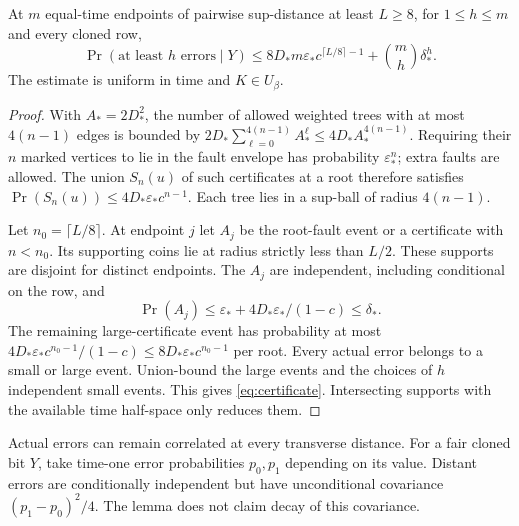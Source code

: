 \begin{lemma}\label{lem:certificates}
At $m$ equal-time endpoints of pairwise sup-distance at least
$L\geq8$, for $1\leq h\leq m$ and every cloned row,
\begin{equation}\label{eq:certificate}
 \Pr(\text{at least }h\text{ errors}\mid Y)
 \leq8D_*m\varepsilon_*c^{\lceil L/8\rceil-1}
                                  +\binom mh\delta_*^h.
\end{equation}
The estimate is uniform in time and $K\in U_\beta$.
\end{lemma}
\begin{proof}
With $A_*=2D_*^2$, the number of allowed weighted trees with at
most $4(n-1)$ edges is bounded by
$2D_*\sum_{\ell=0}^{4(n-1)}A_*^\ell
\leq4D_*A_*^{4(n-1)}$. Requiring their $n$ marked vertices
to lie in the fault envelope has probability $\varepsilon_*^n$;
extra faults are allowed. The union $S_n(u)$ of such certificates
at a root therefore satisfies
$\Pr(S_n(u))\leq4D_*\varepsilon_*c^{n-1}$.
Each tree lies in a sup-ball of radius $4(n-1)$.

Let $n_0=\lceil L/8\rceil$. At endpoint $j$ let $A_j$ be the
root-fault event or a certificate with $n<n_0$. Its supporting
coins lie at radius strictly less than $L/2$. These supports are
disjoint for distinct endpoints. The $A_j$ are independent,
including conditional on the row, and
\[
 \Pr(A_j)\leq\varepsilon_*+
       4D_*\varepsilon_* /(1-c)\leq\delta_*.
\]
The remaining large-certificate event has probability at most
$4D_*\varepsilon_*c^{n_0-1}/(1-c)
\leq8D_*\varepsilon_*c^{n_0-1}$ per root.
Every actual error belongs to a small or large event. Union-bound
the large events and the choices of $h$ independent small events.
This gives \eqref{eq:certificate}. Intersecting supports with the
available time half-space only reduces them.
\end{proof}

Actual errors can remain correlated at every transverse distance.
For a fair cloned bit $Y$, take time-one error probabilities
$p_0,p_1$ depending on its value. Distant errors are conditionally
independent but have unconditional covariance $(p_1-p_0)^2/4$.
The lemma does not claim decay of this covariance.

